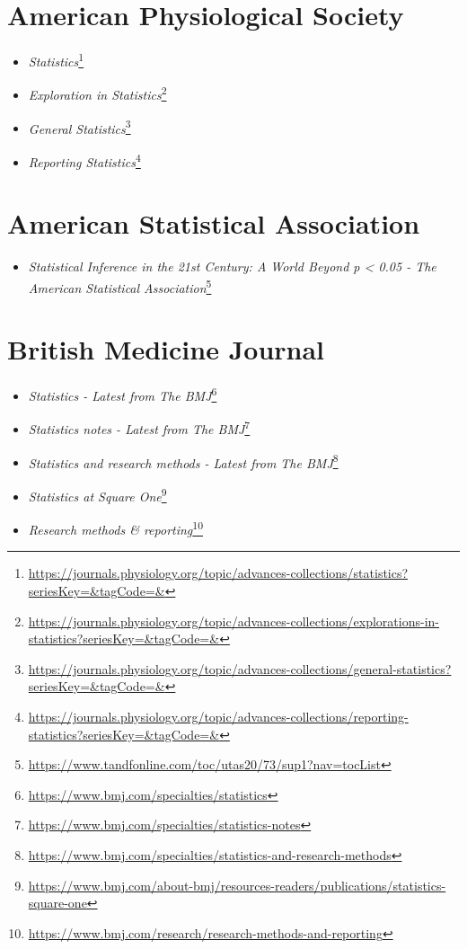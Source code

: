 \documentclass[
  a4paper,
]{book}
\providecommand{\tightlist}{%
  \setlength{\itemsep}{0pt}\setlength{\parskip}{0pt}}
\renewcommand{\href}[2]{#2\footnote{\url{#1}}}
\begin{document}
\hypertarget{american-physiological-society}{%
\section*{American Physiological Society}\label{american-physiological-society}}

\begin{itemize}
\item
  \href{https://journals.physiology.org/topic/advances-collections/statistics?seriesKey=\&tagCode=\&}{\emph{Statistics}}
\item
  \href{https://journals.physiology.org/topic/advances-collections/explorations-in-statistics?seriesKey=\&tagCode=\&}{\emph{Exploration in Statistics}}
\item
  \href{https://journals.physiology.org/topic/advances-collections/general-statistics?seriesKey=\&tagCode=\&}{\emph{General Statistics}}
\item
  \href{https://journals.physiology.org/topic/advances-collections/reporting-statistics?seriesKey=\&tagCode=\&}{\emph{Reporting Statistics}}
\end{itemize}

\hypertarget{american-statistical-association}{%
\section*{American Statistical Association}\label{american-statistical-association}}

\begin{itemize}
\tightlist
\item
  \href{https://www.tandfonline.com/toc/utas20/73/sup1?nav=tocList}{\emph{Statistical Inference in the 21st Century: A World Beyond p \textless{} 0.05 - The American Statistical Association}}
\end{itemize}

\hypertarget{british-medicine-journal}{%
\section*{British Medicine Journal}\label{british-medicine-journal}}

\begin{itemize}
\item
  \href{https://www.bmj.com/specialties/statistics}{\emph{Statistics - Latest from The BMJ}}
\item
  \href{https://www.bmj.com/specialties/statistics-notes}{\emph{Statistics notes - Latest from The BMJ}}
\item
  \href{https://www.bmj.com/specialties/statistics-and-research-methods}{\emph{Statistics and research methods - Latest from The BMJ}}
\item
  \href{https://www.bmj.com/about-bmj/resources-readers/publications/statistics-square-one}{\emph{Statistics at Square One}}
\item
  \href{https://www.bmj.com/research/research-methods-and-reporting}{\emph{Research methods \& reporting}}
\end{itemize}
\end{document}

